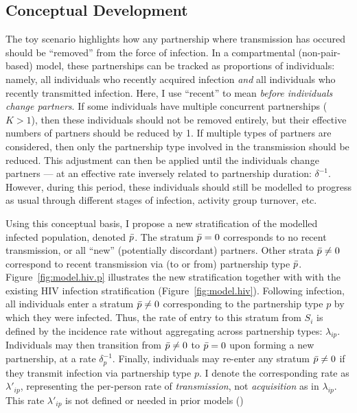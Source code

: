 \subsection{Conceptual Development}\label{foi.prop.concept}
The toy scenario highlights how any partnership where transmission has occured
should be ``removed'' from the force of infection.
In a compartmental (non-pair-based) model,
these partnerships can be tracked as proportions of individuals: namely,
all individuals who recently acquired infection \emph{and}
all individuals who recently transmitted infection.
Here, I use ``recent'' to mean \emph{before individuals change partners}.
If some individuals have multiple concurrent partnerships ($K > 1$),
then these individuals should not be removed entirely,
but their effective numbers of partners should be reduced by 1.
If multiple types of partners are considered,
then only the partnership type involved in the transmission should be reduced.
This adjustment can then be applied until the individuals change partners
--- at an effective rate inversely related to partnership duration: $\delta^{-1}$.
However, during this period, these individuals should still be modelled
to progress as usual through different stages of infection, activity group turnover, etc.
\par
Using this conceptual basis,
I propose a new stratification of the modelled infected population, denoted $\bar{p}$.
The stratum $\bar{p} = 0$ corresponds to no recent transmission,
or all ``new'' (potentially discordant) partners.
Other strata $\bar{p} \ne 0$ correspond to recent transmission via (to or from) partnership type $\bar{p}$.
Figure~\ref{fig:model.hiv.p} illustrates the new stratification
together with with the existing HIV infection stratification (Figure~\ref{fig:model.hiv}).
Following infection, all individuals enter a stratum $\bar{p} \ne 0$
corresponding to the partnership type $p$ by which they were infected.
Thus, the rate of entry to this stratum from $S_i$ is defined by
the incidence rate without aggregating across partnership types: $\lambda_{ip}$.
Individuals may then transition from $\bar{p} \ne 0$ to $\bar{p} = 0$
upon forming a new partnership, at a rate $\delta_p^{-1}$.
Finally, individuals may re-enter any stratum $\bar{p} \ne 0$
if they transmit infection via partnership type $p$.
I denote the corresponding rate as $\lambda'_{ip}$,
representing the per-person rate of \emph{transmission},
not \emph{acquisition} as in $\lambda_{ip}$.
This rate $\lambda'_{ip}$ is not defined or needed in prior models ()
